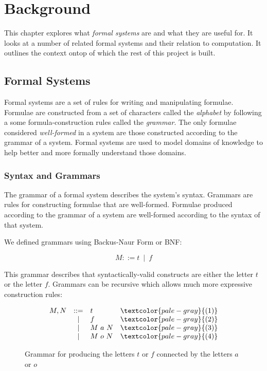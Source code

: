 
\chapter{Background}\label{chapter:background}

This chapter explores what \emph{formal systems} are and what they are useful for. It looks at a number of related formal systems and their relation to computation. It outlines the context ontop of which the rest of this project is built.


\section{Formal Systems}

Formal systems are a set of rules for writing and manipulating
formulae. Formulae are constructed from a set of characters called the
\emph{alphabet} by following a some formula-construction rules called
the \emph{grammar}. The only formulae considered \emph{well-formed} in
a system are those constructed according to the grammar of a system.
Formal systems are used to model domains of knowledge to help better
and more formally understand those domains.

\subsection{Syntax and Grammars}

The grammar of a formal system describes the system's syntax. Grammars are 
rules for constructing formulae that are well-formed. Formulae
produced according to the grammar of a system are well-formed according to 
the syntax of that system.

We defined grammars using Backus-Naur Form or BNF:

\[
  M ::= t\ \mid\ f
\]

This grammar describes that syntactically-valid constructs are either
the letter $t$ or the letter $f$. Grammars can be recursive
which allows much more expressive construction rules:

\begin{figure}[!h]\label{fig:tf-grammar}
\[
  \begin{array}{lclr}
    M,N&::=&t&\textcolor{pale-gray}{(1)} \\
      &|&f&\textcolor{pale-gray}{(2)} \\
      &|&M\ a\ N&\textcolor{pale-gray}{(3)} \\
      &|&M\ o\ N&\textcolor{pale-gray}{(4)}
  \end{array}
\]
\caption{Grammar for producing the letters $t$ or $f$ connected by the letters $a$ or $o$}
\end{figure}

